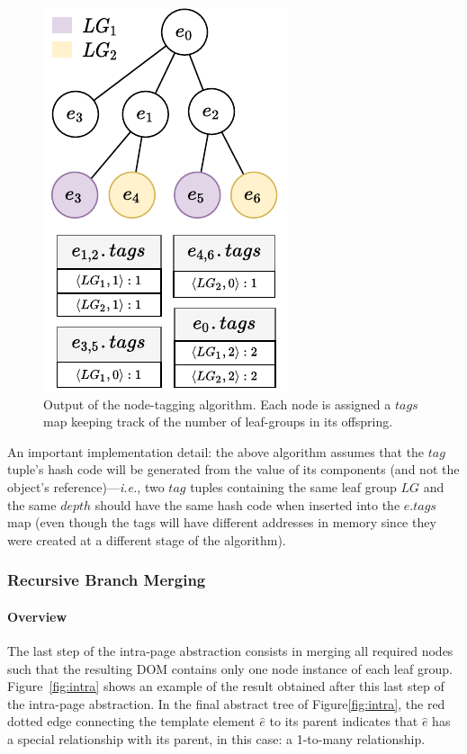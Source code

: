 \begin{figure}[ht]
  \centering
  \includegraphics[width=0.5\linewidth]{appstract/explanations/node-tagging}
  \caption{Output of the node-tagging algorithm. Each node is assigned a $tags$ map keeping track of the number of leaf-groups in its offspring.}
  \label{fig:node_tagging}
\end{figure}

An important implementation detail: the above algorithm assumes that the $tag$ tuple's hash code will be generated from the value of its components (and not the object's reference)---\emph{i.e.}, two $tag$ tuples containing the same leaf group $LG$ and the same $depth$ should have the same hash code when inserted into the $e.tags$ map (even though the tags will have different addresses in memory since they were created at a different stage of the algorithm).

\subsubsection{Recursive Branch Merging}
\paragraph{Overview}
The last step of the intra-page abstraction consists in merging all required nodes such that the resulting DOM contains only one node instance of each leaf group. 
Figure~\ref{fig:intra} shows an example of the result obtained after this last step of the intra-page abstraction. 
In the final abstract tree of Figure\ref{fig:intra}, the red dotted edge connecting the template element $\hat{e}$ to its parent indicates that $\hat{e}$ has a special relationship with its parent, in this case: a 1-to-many relationship.

